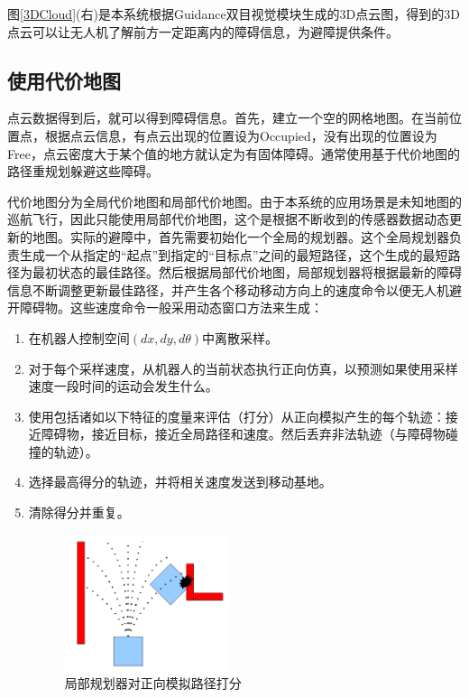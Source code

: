 图\ref{3DCloud}(右)是本系统根据Guidance双目视觉模块生成的3D点云图，得到的3D点云可以让无人机了解前方一定距离内的障碍信息，为避障提供条件。


\subsection{使用代价地图}

点云数据得到后，就可以得到障碍信息。首先，建立一个空的网格地图。在当前位置点，根据点云信息，有点云出现的位置设为Occupied，没有出现的位置设为Free，点云密度大于某个值的地方就认定为有固体障碍。通常使用基于代价地图的路径重规划躲避这些障碍。

代价地图分为全局代价地图和局部代价地图。由于本系统的应用场景是未知地图的巡航飞行，因此只能使用局部代价地图，这个是根据不断收到的传感器数据动态更新的地图。实际的避障中，首先需要初始化一个全局的规划器。这个全局规划器负责生成一个从指定的“起点”到指定的“目标点”之间的最短路径，这个生成的最短路径为最初状态的最佳路径。然后根据局部代价地图，局部规划器将根据最新的障碍信息不断调整更新最佳路径，并产生各个移动移动方向上的速度命令以便无人机避开障碍物。这些速度命令一般采用动态窗口方法来生成：
\begin{enumerate}[1)]
\item 在机器人控制空间$(dx,dy,d\theta)$中离散采样。
\item 对于每个采样速度，从机器人的当前状态执行正向仿真，以预测如果使用采样速度一段时间的运动会发生什么。
\item 使用包括诸如以下特征的度量来评估（打分）从正向模拟产生的每个轨迹：接近障碍物，接近目标，接近全局路径和速度。然后丢弃非法轨迹（与障碍物碰撞的轨迹）。
\item 选择最高得分的轨迹，并将相关速度发送到移动基地。
\item 清除得分并重复。

\begin{figure}[h]
    \centering
    \includegraphics[height=4cm]{figures/局部规划器对正向模拟路径打分.png}
    \caption{局部规划器对正向模拟路径打分}\label{Grade}
\end{figure}

\end{enumerate}


